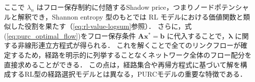 ここで $\lambda_n$ はフロー保存制約に付随するShadow price，つまりノードポテンシャルと解釈でき，Shannon entropy 型のもとでは RL モデルにおける価値関数と類似した役割を果たす（\eqref{eq:rl-value-logsum}参照）．
さらに，式(\ref{eq:purc_optimal_flow})をフロー保存条件 $\bm A\bm x^*=\bm b$ に代入することで，$\bm\lambda$ に関する非線形連立方程式が得られる．
これを解くことで全てのリンクフローが確定するため，経路を明示的に列挙することなくネットワーク全体のフロー配分を直接求めることができる．
この点は，経路集合や再帰方程式に基づいて解を構成するRL型の経路選択モデルとは異なる，PURCモデルの重要な特徴である．





